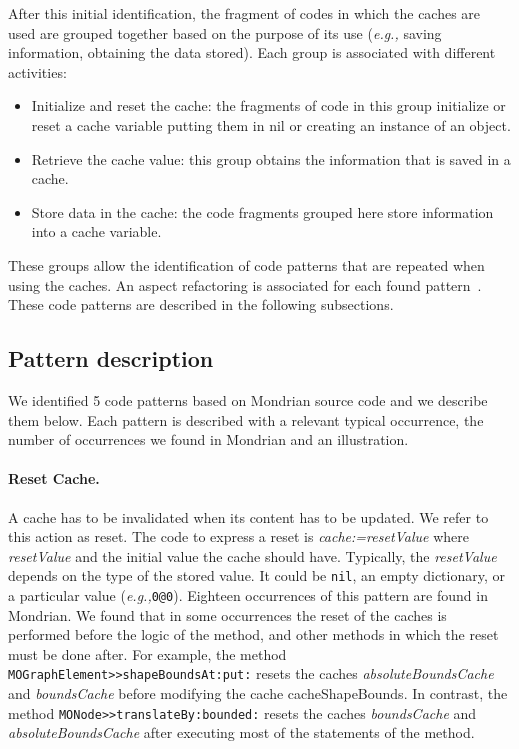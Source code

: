 \documentclass[preprint,10pt]{sigplanconf}
\newcommand{\ct}{\lstinline[backgroundcolor=\color{white},basicstyle=\footnotesize\ttfamily]}
\newcommand{\ab}[1]{\nb{Alexandre}{blue}{#1}}
\newcommand{\sv}[1]{\nb{Santiago}{orange}{#1}}
\newcommand{\eg}{\emph{e.g.,}\xspace}
\newcommand{\seclabel}[1]{\label{sec:#1}}
\begin{document}
After this initial identification, the fragment of codes in which the caches are used
are grouped together based on the purpose of its use (\eg saving information, obtaining the data stored). Each group is associated with different activities:
\begin{itemize}
\item Initialize and reset the cache: the fragments of code in this group initialize or reset a cache variable putting them in nil or creating an instance of an object.
\item Retrieve the cache value: this group obtains the information that is saved in a cache.
\item Store data in the cache: the code fragments grouped here store information into a cache variable.
\end{itemize}

These groups allow the identification of code patterns that are
repeated when using the caches. An aspect refactoring is associated for each found pattern~\cite{Kellens2007}. These code patterns are described in the following subsections.

\subsection{Pattern description}\seclabel{Pattern-Identification}


We identified 5 code patterns based on Mondrian source code and we describe them below.
Each pattern is described with a relevant typical occurrence,
the number of occurrences we found in Mondrian and an illustration.

\paragraph{Reset Cache.} A cache has to be invalidated when its content has to be updated. We refer to this action as reset. The code to express a reset is \emph{cache:=resetValue} where
\emph{resetValue} and the initial value the cache should have. Typically, the \emph{resetValue} depends on the type of the stored value. It could be \ct{nil}, an empty dictionary, or a particular value (\eg \ct{0@0}).
Eighteen occurrences of this pattern are found in Mondrian. 
We found that in some occurrences the reset of the caches is performed before the logic of the method, and other methods in which the reset must be done after. For example, the method \ct{MOGraphElement>>shapeBoundsAt:put:} resets the caches \emph{absoluteBoundsCache} and \emph{boundsCache} before modifying the cache cacheShapeBounds. In contrast, the method \ct{MONode>>translateBy:bounded:} resets the caches \emph{boundsCache} and \emph{absoluteBoundsCache} after executing most of the statements of the method. 
\end{document}

